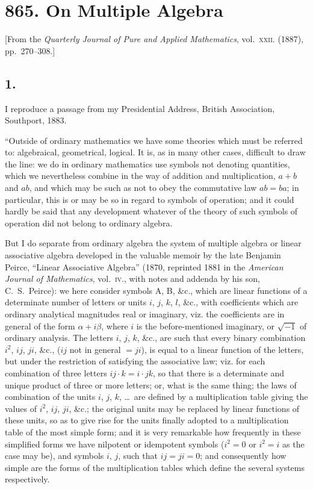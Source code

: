 \documentclass[11pt,a4paper]{article}
\theoremstyle{definition}
\begin{document}
\section*{865. On Multiple Algebra}

\begin{center}
[From the \textit{Quarterly Journal of Pure and Applied Mathematics}, vol.~\textsc{xxii}. (1887), pp.~270--308.]
\end{center}

\subsection*{1.}

I reproduce a passage from my Presidential Address, British Association, Southport, 1883.

``Outside of ordinary mathematics we have some theories which must be referred to: algebraical, geometrical, logical. It is, as in many other cases, difficult to draw the line: we do in ordinary mathematics use symbols not denoting quantities, which we nevertheless combine in the way of addition and multiplication, $a + b$ and $ab$, and which may be such as not to obey the commutative law $ab = ba$; in particular, this is or may be so in regard to symbols of operation; and it could hardly be said that any development whatever of the theory of such symbols of operation did not belong to ordinary algebra.

But I do separate from ordinary algebra the system of multiple algebra or linear associative algebra developed in the valuable memoir by the late Benjamin Peirce, ``Linear Associative Algebra'' (1870, reprinted 1881 in the \textit{American Journal of Mathematics}, vol.~\textsc{iv}., with notes and addenda by his son, C.~S.~Peirce): we here consider symbols A, B, \&c., which are linear functions of a determinate number of letters or units $i$, $j$, $k$, $l$, \&c., with coefficients which are ordinary analytical magnitudes real or imaginary, viz. the coefficients are in general of the form $\alpha + i\beta$, where $i$ is the before-mentioned imaginary, or $\sqrt{-1}$ of ordinary analysis. The letters $i$, $j$, $k$, \&c., are such that every binary combination $i^2$, $ij$, $ji$, \&c., ($ij$ not in general $= ji$), is equal to a linear function of the letters, but under the restriction of satisfying the associative law; viz. for each combination of three letters $ij \cdot k = i \cdot jk$, so that there is a determinate and unique product of three or more letters; or, what is the same thing; the laws of combination of the units $i$, $j$, $k$, \ldots\ are defined by a multiplication table giving the values of $i^2$, $ij$, $ji$, \&c.; the original units may be replaced by linear functions of these units, so as to give rise for the units finally adopted to a multiplication table of the most simple form; and it is very remarkable how frequently in these simplified forms we have nilpotent or idempotent symbols ($i^2 = 0$ or $i^2 = i$ as the case may be), and symbols $i$, $j$, such that $ij = ji = 0$; and consequently how simple are the forms of the multiplication tables which define the several systems respectively.
\end{document}
